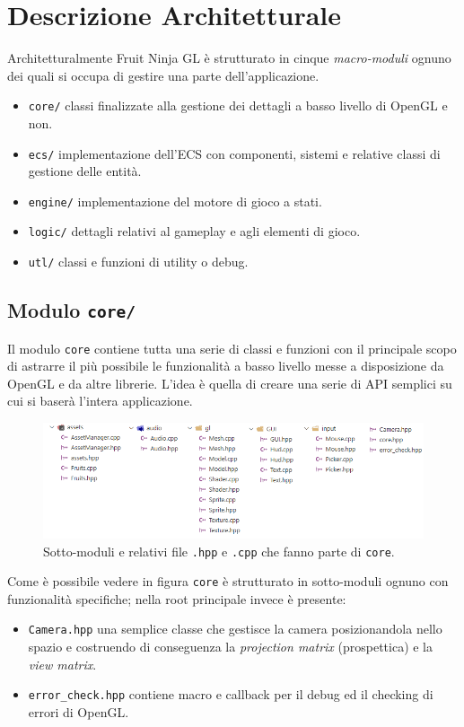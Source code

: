 \section{Descrizione Architetturale}
Architetturalmente Fruit Ninja GL è strutturato in cinque \textit{macro-moduli} ognuno dei quali si occupa di gestire una parte dell'applicazione. 
\begin{itemize}
	\item \texttt{core/} classi finalizzate alla gestione dei dettagli a basso livello di OpenGL e non.
	\item \texttt{ecs/} implementazione dell'ECS con componenti, sistemi e relative classi di gestione delle entità.
	\item \texttt{engine/} implementazione del motore di gioco a stati.
	\item \texttt{logic/} dettagli relativi al gameplay e agli elementi di gioco.
	\item \texttt{utl/} classi e funzioni di utility o debug.
\end{itemize}

\subsection{Modulo \texttt{core/}}
Il modulo \texttt{core} contiene tutta una serie di classi e funzioni con il principale scopo di astrarre il più possibile le funzionalità a basso livello messe a disposizione da OpenGL e da altre librerie. L'idea è quella di creare una serie di API semplici su cui si baserà l'intera applicazione.

\begin{figure}[!hpt]
	\centering
	\includegraphics[width=\linewidth]{images/ch20/1}
	\caption{Sotto-moduli e relativi file \texttt{.hpp} e \texttt{.cpp} che fanno parte di \texttt{core}.}
	\label{fig:module-core}
\end{figure}

Come è possibile vedere in figura  \texttt{core} è strutturato in sotto-moduli ognuno con funzionalità specifiche; nella root principale invece è presente:
\begin{itemize}
\item \texttt{Camera.hpp} una semplice classe che gestisce la camera posizionandola nello spazio e costruendo di conseguenza la \textit{projection matrix} (prospettica) e la \textit{view matrix}.
\item \texttt{error\_check.hpp} contiene macro e callback per il debug ed il checking di errori di OpenGL.
\end{itemize}

